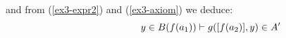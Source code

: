 \noindent
				and from (\ref{ex3-expr2}) and (\ref{ex3-axiom}) we deduce: \begin{equation}
				\hspace{2cm}y \in B(f(a_1)) \vdash g([f(a_2)], y) \in A'\label{ex3-expr3}
				\end{equation}
			